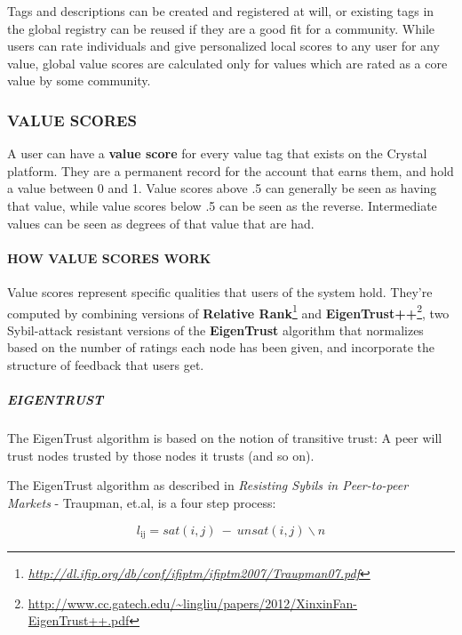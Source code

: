 Tags and descriptions can be created and registered at will, or existing
tags in the global registry can be reused if they are a good fit for a
community. While users can rate individuals and give personalized local
scores to any user for any value, global value scores are calculated
only for values which are rated as a core value by some community.

\subsubsection{\texorpdfstring{\protect\hypertarget{_6bm08b4j0oam}{}{\protect\hypertarget{_Toc462050411}{}{}}VALUE
SCORES}{VALUE SCORES}}\label{value-scores}

A user can have a \textbf{value score} for every value tag that exists
on the Crystal platform. They are a permanent record for the account
that earns them, and hold a value between 0 and 1. Value scores above .5
can generally be seen as having that value, while value scores below .5
can be seen as the reverse. Intermediate values can be seen as degrees
of that value that are had.

\paragraph{HOW VALUE SCORES WORK}\label{how-value-scores-work}

Value scores represent specific qualities that users of the system hold.
They're computed by combining versions of \textbf{Relative
Rank}\footnote{\href{http://dl.ifip.org/db/conf/ifiptm/ifiptm2007/Traupman07.pdf}{\emph{http://dl.ifip.org/db/conf/ifiptm/ifiptm2007/Traupman07.pdf}}}
and \textbf{EigenTrust++}\footnote{\url{http://www.cc.gatech.edu/~lingliu/papers/2012/XinxinFan-EigenTrust++.pdf}},
two Sybil-attack resistant versions of the \textbf{EigenTrust} algorithm
that normalizes based on the number of ratings each node has been given,
and incorporate the structure of feedback that users get.

\subparagraph{EIGENTRUST}\label{eigentrust}

The EigenTrust algorithm is based on the notion of transitive trust: A
peer will trust nodes trusted by those nodes it trusts (and so on).

The EigenTrust algorithm as described in \emph{Resisting Sybils in
Peer-to-peer Markets} - Traupman, et.al, is a four step process:

\[l_{\text{ij}} = sat(i,j)\  - \ unsat(i,j)\backslash n\]

